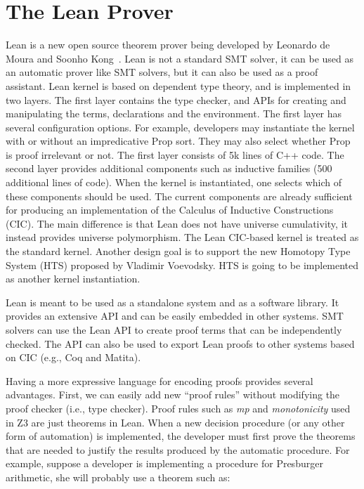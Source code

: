 \documentclass{llncs}
\begin{document}
\section{The Lean Prover}
\label{sec:lean}
Lean is a new open source theorem prover being developed by Leonardo
de Moura and Soonho Kong~\cite{lean}. Lean is not a standard SMT
solver, it can be used as an automatic prover like SMT solvers, but it
can also be used as a proof assistant. Lean kernel is based on
dependent type theory, and is implemented in two layers. The first
layer contains the type checker, and APIs for creating and
manipulating the terms, declarations and the environment. The first
layer has several configuration options. For example, developers may
instantiate the kernel with or without an impredicative Prop sort.
They may also select whether Prop is proof irrelevant or not. The
first layer consists of 5k lines of C++ code. The second layer
provides additional components such as inductive families (500
additional lines of code). When the kernel is instantiated, one
selects which of these components should be used. The current
components are already sufficient for producing an implementation of
the Calculus of Inductive Constructions (CIC). The main difference is
that Lean does not have universe cumulativity, it instead provides
universe polymorphism. The Lean CIC-based kernel is treated as the standard
kernel. Another design goal is to support the new Homotopy Type System
(HTS) proposed by Vladimir Voevodsky. HTS is going to be implemented
as another kernel instantiation.

Lean is meant to be used as a standalone system and as a software
library. It provides an extensive API and can be easily embedded in
other systems. SMT solvers can use the Lean API to create proof terms
that can be independently checked. The API can also be used to export
Lean proofs to other systems based on CIC (e.g., Coq and Matita).

Having a more expressive language for encoding proofs provides several
advantages. First, we can easily add new ``proof rules'' without
modifying the proof checker (i.e., type checker). Proof rules such as
\emph{mp} and \emph{monotonicity} used in Z3 are just theorems in Lean.
When a new decision procedure (or any other form of
automation) is implemented, the developer must first prove the theorems
that are needed to justify the results produced by the automatic
procedure. For example, suppose a developer is implementing a procedure for
Presburger arithmetic, she will probably use a theorem such as:
\end{document}
